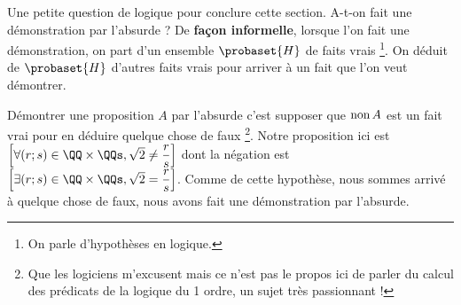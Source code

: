 \begin{remark}
	Une petite question de logique pour conclure cette section.
	A-t-on fait une démonstration par l'absurde ? 
	De \textbf{façon informelle}, lorsque l'on fait une démonstration, on part d'un ensemble $\probaset{H}$ de faits vrais
	\footnote{
		On parle d'hypothèses en logique.
	}.
	On déduit de $\probaset{H}$ d'autres faits vrais pour arriver à un fait que l'on veut démontrer.
	
	\smallskip
	
	Démontrer une proposition $A$ par l'absurde c'est supposer que $\text{\normalfont non \!} A$ est un fait vrai pour en déduire quelque chose de faux
	\footnote{
		Que les logiciens m'excusent mais ce n'est pas le propos ici de parler du calcul des prédicats de la logique du 1\ier{} ordre, un sujet très passionnant !
	}.
	Notre proposition ici est
	$\left[ \forall (r ; s) \in \QQ \times \QQs , \sqrt2 \neq \dfrac{r}{s} \right]$
	dont la négation est 
	$\left[ \exists (r ; s) \in \QQ \times \QQs , \sqrt2 = \dfrac{r}{s} \right]$.
	Comme de cette hypothèse, nous sommes arrivé à quelque chose de faux, nous avons fait une démonstration par l'absurde.	
\end{remark}


